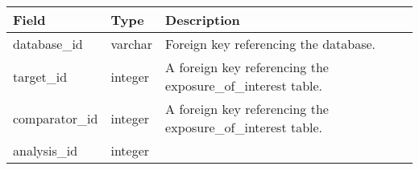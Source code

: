 \documentclass[
]{article}
\begin{document}
\begin{longtable}[]{@{}lll@{}}
\toprule
\begin{minipage}[b]{0.23\columnwidth}\raggedright
Field\strut
\end{minipage} & \begin{minipage}[b]{0.18\columnwidth}\raggedright
Type\strut
\end{minipage} & \begin{minipage}[b]{0.50\columnwidth}\raggedright
Description\strut
\end{minipage}\tabularnewline
\midrule
\endhead
\begin{minipage}[t]{0.23\columnwidth}\raggedright
database\_id\strut
\end{minipage} & \begin{minipage}[t]{0.18\columnwidth}\raggedright
varchar\strut
\end{minipage} & \begin{minipage}[t]{0.50\columnwidth}\raggedright
Foreign key referencing the database.\strut
\end{minipage}\tabularnewline
\begin{minipage}[t]{0.23\columnwidth}\raggedright
target\_id\strut
\end{minipage} & \begin{minipage}[t]{0.18\columnwidth}\raggedright
integer\strut
\end{minipage} & \begin{minipage}[t]{0.50\columnwidth}\raggedright
A foreign key referencing the exposure\_of\_interest table.\strut
\end{minipage}\tabularnewline
\begin{minipage}[t]{0.23\columnwidth}\raggedright
comparator\_id\strut
\end{minipage} & \begin{minipage}[t]{0.18\columnwidth}\raggedright
integer\strut
\end{minipage} & \begin{minipage}[t]{0.50\columnwidth}\raggedright
A foreign key referencing the exposure\_of\_interest table.\strut
\end{minipage}\tabularnewline
\begin{minipage}[t]{0.23\columnwidth}\raggedright
analysis\_id\strut
\end{minipage} & \begin{minipage}[t]{0.18\columnwidth}\raggedright
integer\strut
\end{minipage} & \begin{minipage}[t]{0.50\columnwidth}\raggedright

\end{minipage}
\end{longtable}
\end{document}
